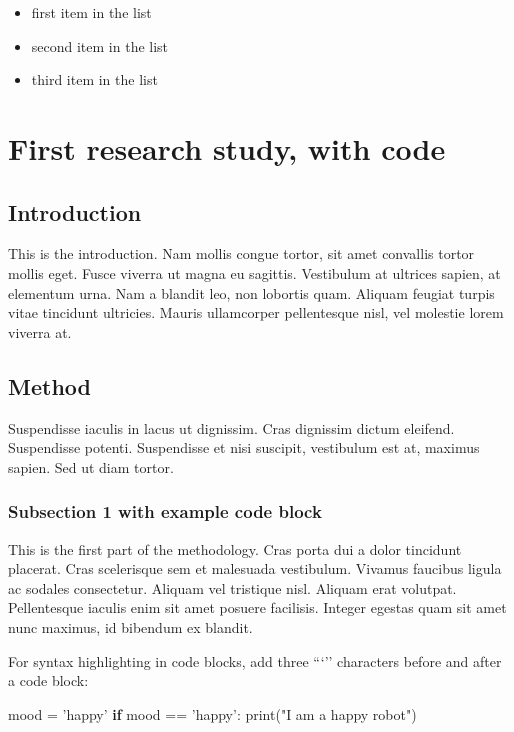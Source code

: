\documentclass[11pt,letterpaper,]{article}
\newenvironment{Shaded}{}{}
\newcommand{\StringTok}[1]{\textcolor[rgb]{0.25,0.44,0.63}{{#1}}}
\newcommand{\ControlFlowTok}[1]{\textcolor[rgb]{0.00,0.44,0.13}{\textbf{{#1}}}}
\newcommand{\OperatorTok}[1]{\textcolor[rgb]{0.40,0.40,0.40}{{#1}}}
\newcommand{\BuiltInTok}[1]{{#1}}
\newcommand{\NormalTok}[1]{{#1}}
\providecommand{\tightlist}{%
  \setlength{\itemsep}{0pt}\setlength{\parskip}{0pt}}
\begin{document}
\begin{itemize}
\tightlist
\item
  first item in the list
\item
  second item in the list
\item
  third item in the list
\end{itemize}

\section{First research study, with
code}\label{first-research-study-with-code}

\subsection{Introduction}\label{introduction-1}

This is the introduction. Nam mollis congue tortor, sit amet convallis
tortor mollis eget. Fusce viverra ut magna eu sagittis. Vestibulum at
ultrices sapien, at elementum urna. Nam a blandit leo, non lobortis
quam. Aliquam feugiat turpis vitae tincidunt ultricies. Mauris
ullamcorper pellentesque nisl, vel molestie lorem viverra at.

\subsection{Method}\label{method}

Suspendisse iaculis in lacus ut dignissim. Cras dignissim dictum
eleifend. Suspendisse potenti. Suspendisse et nisi suscipit, vestibulum
est at, maximus sapien. Sed ut diam tortor.

\subsubsection{Subsection 1 with example code
block}\label{subsection-1-with-example-code-block}

This is the first part of the methodology. Cras porta dui a dolor
tincidunt placerat. Cras scelerisque sem et malesuada vestibulum.
Vivamus faucibus ligula ac sodales consectetur. Aliquam vel tristique
nisl. Aliquam erat volutpat. Pellentesque iaculis enim sit amet posuere
facilisis. Integer egestas quam sit amet nunc maximus, id bibendum ex
blandit.

For syntax highlighting in code blocks, add three ```'' characters
before and after a code block:

\begin{Shaded}
\begin{Highlighting}[]
\NormalTok{mood }\OperatorTok{=} \StringTok{'happy'}
\ControlFlowTok{if} \NormalTok{mood }\OperatorTok{==} \StringTok{'happy'}\NormalTok{:}
    \BuiltInTok{print}\NormalTok{(}\StringTok{"I am a happy robot"}\NormalTok{)}
\end{Highlighting}
\end{Shaded}
\end{document}
